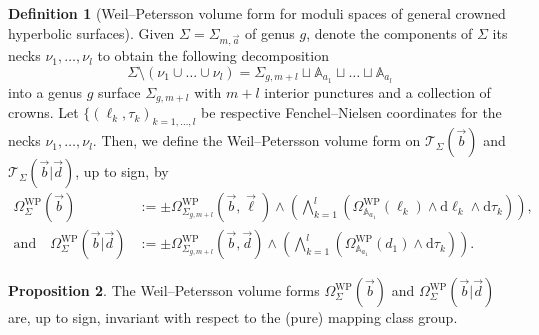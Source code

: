 \documentclass{amsart}
\theoremstyle{definition}
\newtheorem{proposition}{Proposition}[section]
\newtheorem{definition}[proposition]{Definition}
\begin{document}
\begin{definition}[Weil--Petersson volume form for moduli spaces of general crowned hyperbolic surfaces]
    Given $\Sigma=\Sigma_{m,\vec{a}}$ of genus $g$, denote the components of $\Sigma$ its necks $\nu_1,\ldots,\nu_l$ to obtain the following decomposition 
\[
\Sigma\setminus(\nu_1\cup\ldots\cup\nu_l)=\Sigma_{g,m+l}\sqcup\mathbb{A}_{a_1}\sqcup\ldots\sqcup\mathbb{A}_{a_l}
\]
into a genus $g$ surface $\Sigma_{g,m+l}$ with $m+l$ interior punctures and a collection of crowns. Let $\{(\ell_k,\tau_k)_{k=1,\ldots,l}$ be respective Fenchel--Nielsen coordinates for the necks $\nu_1,\ldots,\nu_l$. Then, we define the Weil--Petersson volume form on $\mathcal{T}_{\Sigma}(\vec{b})$ and $\mathcal{T}_{\Sigma}(\vec{b}|\vec{d})$, up to sign, by
\begin{equation}
\begin{split}
\Omega^{\mathrm{WP}}_{\Sigma}(\vec{b})
& := \pm
\Omega^{\mathrm{WP}}_{\Sigma_{g,m+l}}(\vec{b},\vec{\ell})
\wedge 
\left(\bigwedge_{k=1}^l(\Omega^{\mathrm{WP}}_{\mathbb{A}_{a_1}}(\ell_k)
\wedge\mathrm{d}\ell_k\wedge\mathrm{d}\tau_k)\right),\\
\text{and}\quad
\Omega^{\mathrm{WP}}_{\Sigma}(\vec{b}|\vec{d})
& := \pm
\Omega^{\mathrm{WP}}_{\Sigma_{g,m+l}}(\vec{b},\vec{d})
\wedge  
\left(\bigwedge_{k=1}^l 
(\Omega^{\mathrm{WP}}_{\mathbb{A}_{a_1}}(d_1)\wedge\mathrm{d}\tau_k)
\right).
\label{prop:vol-form-scc-new}
\end{split}
\end{equation}
\end{definition}


\begin{proposition}
The Weil--Petersson volume forms $\Omega^{\mathrm{WP}}_{\Sigma}(\vec{b})$ and $\Omega^{\mathrm{WP}}_{\Sigma}(\vec{b}|\vec{d})$ are, up to sign, invariant with respect to the (pure) mapping class group.
\end{proposition}
\end{document}
